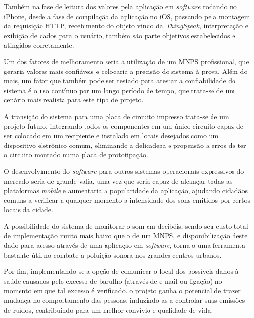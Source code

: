 \documentclass[
    12pt,               %
    openright,          %
    oneside,
    a4paper,            
    english,            %
    brazil              %
    ]{abntex2}
\begin{document}
Também na fase de leitura dos valores pela aplicação em \textit{software} rodando no iPhone, desde a fase de compilação da aplicação no iOS, passando pela montagem da requisição HTTP, recebimento do objeto vindo da \textit{ThingSpeak}, interpretação e exibição de dados para o usuário, também são parte objetivos estabelecidos e atingidos corretamente.

Um dos fatores de melhoramento seria a utilização de um MNPS profissional, que geraria valores mais confiáveis e colocaria a precisão do sistema à prova. Além do mais, um fator que também pode ser testado para atestar a confiabilidade do sistema é o uso contínuo por um longo período de tempo, que trata-se de um cenário mais realista para este tipo de projeto.

A transição do sistema para uma placa de circuito impresso trata-se de um projeto futuro, integrando todos os componentes em um único circuito capaz de ser colocado em um recipiente e instalado em locais desejados como um dispositivo eletrônico comum, eliminando a delicadeza e propensão a erros de ter o circuito montado numa placa de prototipação. 

O desenvolvimento do \textit{software} para outros sistemas operacionais expressivos do mercado seria de grande valia, uma vez que seria capaz de alcançar todas as plataformas \textit{mobile} e aumentaria a popularidade da aplicação, ajudando cidadãos comuns a verificar a qualquer momento a intensidade dos sons emitidos por certos locais da cidade.

A possibilidade do sistema de monitorar o som em decibéis, sendo seu custo total de implementação muito mais baixo que o de um MNPS, e disponibilização deste dado para acesso através de uma aplicação em \textit{software}, torna-o uma ferramenta bastante útil no combate a poluição sonora nos grandes centros urbanos. 

Por fim, implementando-se a opção de comunicar o local dos possíveis danos à saúde causados pelo excesso de barulho (através de e-mail ou ligação) no momento em que tal excesso é verificado, o projeto ganha o potencial de trazer mudança no comportamento das pessoas, induzindo-as a controlar suas emissões de ruídos, contribuindo para um melhor convívio e qualidade de vida. 

\postextual
\end{document}
